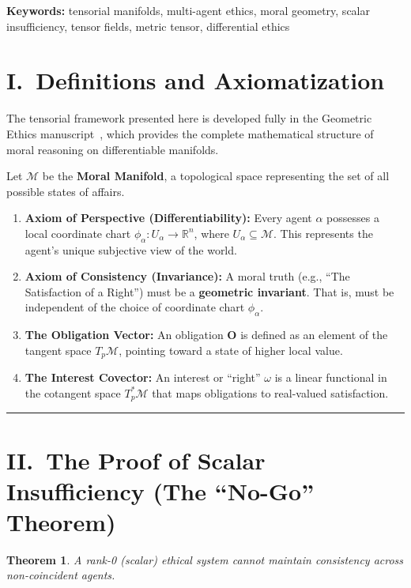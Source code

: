 \documentclass[12pt]{article}
\newtheorem{theorem}{Theorem}
\theoremstyle{remark}
\begin{document}
\noindent\textbf{Keywords:} tensorial manifolds, multi-agent ethics, moral geometry, scalar insufficiency, tensor fields, metric tensor, differential ethics

\section*{I.\ Definitions and Axiomatization}

The tensorial framework presented here is developed fully in the Geometric Ethics manuscript~\cite{bond2026ge}, which provides the complete mathematical structure of moral reasoning on differentiable manifolds.

Let $\mathcal{M}$ be the \textbf{Moral Manifold}, a topological space
representing the set of all possible states of affairs.

\begin{enumerate}
    \item \textbf{Axiom of Perspective (Differentiability):} Every agent
    $\alpha$ possesses a local coordinate chart $\phi_\alpha : U_\alpha \to
    \mathbb{R}^n$, where $U_\alpha \subseteq \mathcal{M}$. This represents the
    agent's unique subjective view of the world.

    \item \textbf{Axiom of Consistency (Invariance):} A moral truth (e.g.,
    ``The Satisfaction of a Right'') must be a \textbf{geometric invariant}.
    That is, must be independent of the choice of coordinate chart
    $\phi_\alpha$.

    \item \textbf{The Obligation Vector:} An obligation $\mathbf{O}$ is defined
    as an element of the tangent space $T_p\mathcal{M}$, pointing toward a
    state of higher local value.

    \item \textbf{The Interest Covector:} An interest or ``right'' $\omega$ is
    a linear functional in the cotangent space $T_p^*\mathcal{M}$ that maps
    obligations to real-valued satisfaction.
\end{enumerate}

\bigskip
\hrule
\bigskip

\section*{II.\ The Proof of Scalar Insufficiency (The ``No-Go'' Theorem)}

\begin{theorem}
A rank-0 (scalar) ethical system cannot maintain consistency across
non-coincident agents.
\end{theorem}
\end{document}
